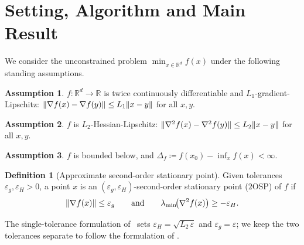 \documentclass[11pt]{article}
\theoremstyle{plain}
\theoremstyle{definition}
\newtheorem{definition}{Definition}[section]
\newtheorem{assumption}{Assumption}[section]
\theoremstyle{remark}
\DeclarePairedDelimiter{\norm}{\lVert}{\rVert}
\newcommand{\R}{\mathbb{R}}
\newcommand{\lmin}{\lambda_{\min}}
\newcommand{\grad}{\nabla}
\newcommand{\Hess}{\nabla^2}
\newcommand{\eps}{\varepsilon}
\newcommand{\epsg}{\eps_{g}}
\newcommand{\epsH}{\eps_{H}}
\begin{document}
\section{Setting, Algorithm and Main Result}
\label{sec:setup}

We consider the unconstrained problem $\min_{x\in\R^{d}}f(x)$ under the
following standing assumptions.

\begin{assumption}\label{ass:smooth}
$f\colon\R^{d}\to\R$ is twice continuously differentiable and
$L_{1}$-gradient-Lipschitz: $\norm{\grad f(x)-\grad f(y)}\le
L_{1}\norm{x-y}$ for all $x,y$.
\end{assumption}

\begin{assumption}\label{ass:hesslip}
$f$ is $L_{2}$-Hessian-Lipschitz: $\norm{\Hess f(x)-\Hess f(y)}\le
L_{2}\norm{x-y}$ for all $x,y$.
\end{assumption}

\begin{assumption}\label{ass:bounded}
$f$ is bounded below, and $\Delta_{f}\coloneqq f(x_{0})-\inf_{x}f(x)<\infty$.
\end{assumption}

\begin{definition}[Approximate second-order stationary point]
\label{def:sosp}
Given tolerances $\epsg,\epsH>0$, a point $x$ is an
$(\epsg,\epsH)$-second-order stationary point ($2$OSP) of $f$ if
\[
  \norm{\grad f(x)}\le\epsg
  \qquad\text{and}\qquad
  \lmin\!\big(\Hess f(x)\big)\ge-\epsH .
\]
\end{definition}

The single-tolerance formulation of~\cite{jipmlr-v70-jin17a,pmlr-v75-jin18a} sets
$\epsH=\sqrt{L_{2}\,\eps}$ and $\epsg=\eps$; we keep the two tolerances
separate to follow the formulation of \cite{RoyerChan2022}.
\end{document}
